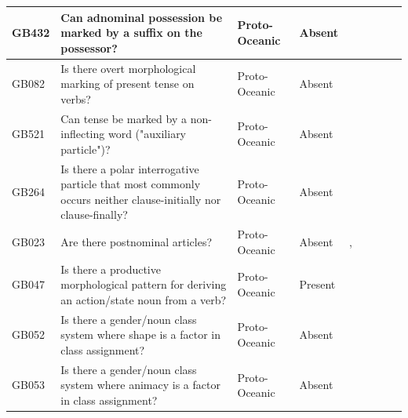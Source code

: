 \documentclass[a4paper,10pt]{article} %
\begin{document}
\begin{landscape}
\begin{longtable}{| p{2cm}| p{3cm}| p{2.5cm}|p{2cm}|p{2cm}|p{2cm}|p{2cm}|p{2cm}|p{2cm}|}
GB432&Can adnominal possession be marked by a suffix on the possessor?&Proto-Oceanic&Absent&\citet[498]{ross2004morphosyntactic}& \cellcolor{hedvig_lightgreen!50}{True Negative} & \cellcolor{hedvig_yellow!50}{Half} & \cellcolor{hedvig_yellow!50}{True Negative} & \cellcolor{hedvig_yellow!50}{Half} \\ \hline
GB082&Is there overt morphological marking of present tense on verbs?&Proto-Oceanic&Absent&\citet[84]{lynchrosscrowley_proto_grammar_oceanic}& \cellcolor{hedvig_lightgreen!50}{True Negative} & \cellcolor{hedvig_yellow!50}{Half} & \cellcolor{hedvig_yellow!50}{True Negative} & \cellcolor{hedvig_yellow!50}{Half} \\ \hline
GB521&Can tense be marked by a non-inflecting word ("auxiliary particle")?&Proto-Oceanic&Absent&\citet[84]{lynchrosscrowley_proto_grammar_oceanic}& \cellcolor{hedvig_lightgreen!50}{True Negative} & \cellcolor{hedvig_yellow!50}{Half} & \cellcolor{hedvig_yellow!50}{True Negative} & \cellcolor{hedvig_yellow!50}{Half} \\ \hline
GB264&Is there a polar interrogative particle that most commonly occurs neither clause-initially nor clause-finally?&Proto-Oceanic&Absent&\citet[89]{lynchrosscrowley_proto_grammar_oceanic}& \cellcolor{hedvig_lightgreen!50}{True Negative} & \cellcolor{hedvig_yellow!50}{Half} & \cellcolor{hedvig_yellow!50}{True Negative} & \cellcolor{hedvig_yellow!50}{Half} \\ \hline
GB023&Are there postnominal articles?&Proto-Oceanic&Absent&\citet[112]{pawley1973some}, \citet[498]{ross2004morphosyntactic}& \cellcolor{hedvig_lightgreen!50}{True Negative} & \cellcolor{hedvig_yellow!50}{Half} & \cellcolor{hedvig_yellow!50}{True Negative} & \cellcolor{hedvig_yellow!50}{Half} \\ \hline
GB047&Is there a productive morphological pattern for deriving an action/state noun from a verb?&Proto-Oceanic&Present&\citet[70]{lynchrosscrowley_proto_grammar_oceanic}& \cellcolor{hedvig_lightgreen!50}{True Positive} & \cellcolor{hedvig_yellow!50}{Half} & \cellcolor{hedvig_lightgreen!50}{True Positive} & \cellcolor{hedvig_yellow!50}{Half} \\ \hline
GB052&Is there a gender/noun class system where shape is a factor in class assignment?&Proto-Oceanic&Absent&\citet[498]{ross2004morphosyntactic}& \cellcolor{hedvig_lightgreen!50}{True Negative} & \cellcolor{hedvig_yellow!50}{Half} & \cellcolor{hedvig_yellow!50}{True Negative} & \cellcolor{hedvig_yellow!50}{Half} \\ \hline
GB053&Is there a gender/noun class system where animacy is a factor in class assignment?&Proto-Oceanic&Absent&\citet[498]{ross2004morphosyntactic}& \cellcolor{hedvig_lightgreen!50}{True Negative} & \cellcolor{hedvig_yellow!50}{Half} & \cellcolor{hedvig_yellow!50}{True Negative} & \cellcolor{hedvig_yellow!50}{Half} \\ \hline

\end{longtable}
\end{landscape}
\end{document}
